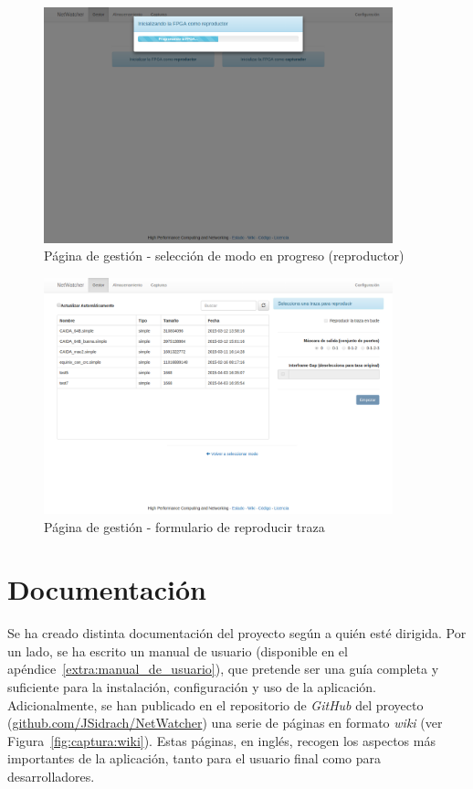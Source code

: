\begin{figure}[!htp]
  \centering
  \includegraphics[width=0.9\textwidth,clip=true]{graphics/capturas/gestor_seleccion_progreso}
  \caption{Página de gestión - selección de modo en progreso (reproductor)}
  \label{fig:capturaselect:gestionprogreso}
\end{figure}

\begin{figure}[!htp]
  \centering
  \includegraphics[width=0.9\textwidth,clip=true]{graphics/capturas/gestor_reproducir}
  \caption{Página de gestión - formulario de reproducir \gls{traza}}
  \label{fig:capturaselect:gestionreproducir}
\end{figure}

\section{Documentación\label{sec:imp:docs}}

Se ha creado distinta documentación del proyecto según a quién esté dirigida.
Por un lado, se ha escrito un manual de usuario (disponible en el apéndice~\ref{extra:manual_de_usuario}), que pretende ser una guía completa y suficiente para la instalación, configuración y uso de la aplicación.
Adicionalmente, se han publicado en el repositorio de \textit{GitHub} del proyecto (\url{github.com/JSidrach/NetWatcher}) una serie de páginas en formato \textit{wiki} (ver Figura~\ref{fig:captura:wiki}).
Estas páginas, en inglés, recogen los aspectos más importantes de la aplicación, tanto para el usuario final como para desarrolladores.

